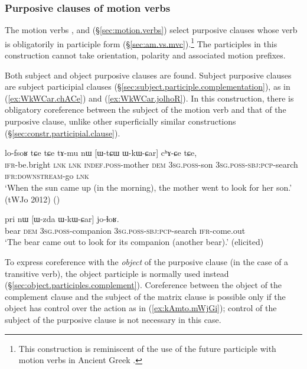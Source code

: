 \subsubsection{Purposive clauses of motion verbs} \label{sec:purposive.clause.motion.verbs}
The motion verbs ,  and   (§\ref{sec:motion.verbs}) select purposive clauses whose verb is obligatorily in participle form (§\ref{sec:am.vs.mvc}).\footnote{This construction is reminiscent of the use of the future participle with motion verbs in Ancient Greek \citep[§177.B]{vernhes96hermaion}. } The participles in this construction cannot take orientation, polarity and associated motion prefixes.

Both subject and object purposive clauses are found. Subject purposive clauses are subject participial clauses (§\ref{sec:subject.participle.complementation}), as in (\ref{ex:WkWCar.chACe}) and (\ref{ex:WkWCar.jolhoR}). In this construction, there is obligatory coreference between the subject of the motion verb and that of the purposive clause, unlike other superficially similar constructions (§\ref{sec:constr.participial.clause}).

\begin{exe}
	\ex \label{ex:WkWCar.chACe}
	\gll lo-fsoʁ tɕe tɕe tɤ-mu nɯ [ɯ-tɕɯ ɯ-kɯ-ɕar] cʰɤ-ɕe tɕe,\\
	\textsc{ifr}-be.bright \textsc{lnk} \textsc{lnk} \textsc{indef}.\textsc{poss}-mother \textsc{dem} \textsc{3sg}.\textsc{poss}-son \textsc{3sg}.\textsc{poss}-\textsc{sbj}:\textsc{pcp}-search \textsc{ifr}:\textsc{downstream}-go \textsc{lnk} \\
	\glt `When the sun came up (in the morning), the mother went to look for her son.' (tWJo 2012)
()
\end{exe}

\begin{exe}
	\ex \label{ex:WkWCar.jolhoR}
	\gll pri nɯ [ɯ-zda ɯ-kɯ-ɕar] jo-ɬoʁ. \\
	bear \textsc{dem} \textsc{3sg}.\textsc{poss}-companion \textsc{3sg}.\textsc{poss}-\textsc{sbj}:\textsc{pcp}-search \textsc{ifr}-come.out \\
	\glt `The bear came out to look for its companion (another bear).' (elicited)
\end{exe}

To express coreference with the \textit{object} of the purposive clause (in the case of a transitive verb), the object participle is normally used instead (§\ref{sec:object.participles.complement}).  Coreference between the object of the complement clause and the subject of the matrix clause is possible only if the object has control over the action as in (\ref{ex:kAmto.mWjGi}); control of the subject of the purposive clause is not necessary in this case.

